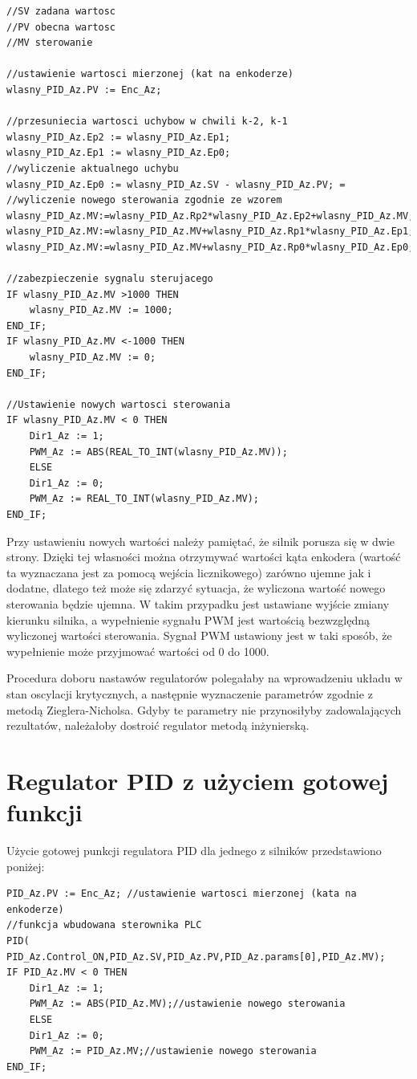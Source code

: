 \begin{lstlisting}[style=customc,frame=single , label=lst:overheat_lock] 
//SV zadana wartosc
//PV obecna wartosc
//MV sterowanie

//ustawienie wartosci mierzonej (kat na enkoderze)
wlasny_PID_Az.PV := Enc_Az; 

//przesuniecia wartosci uchybow w chwili k-2, k-1
wlasny_PID_Az.Ep2 := wlasny_PID_Az.Ep1; 
wlasny_PID_Az.Ep1 := wlasny_PID_Az.Ep0;
//wyliczenie aktualnego uchybu
wlasny_PID_Az.Ep0 := wlasny_PID_Az.SV - wlasny_PID_Az.PV; =
//wyliczenie nowego sterowania zgodnie ze wzorem
wlasny_PID_Az.MV:=wlasny_PID_Az.Rp2*wlasny_PID_Az.Ep2+wlasny_PID_Az.MV;
wlasny_PID_Az.MV:=wlasny_PID_Az.MV+wlasny_PID_Az.Rp1*wlasny_PID_Az.Ep1;
wlasny_PID_Az.MV:=wlasny_PID_Az.MV+wlasny_PID_Az.Rp0*wlasny_PID_Az.Ep0;

//zabezpieczenie sygnalu sterujacego
IF wlasny_PID_Az.MV >1000 THEN
	wlasny_PID_Az.MV := 1000;
END_IF;
IF wlasny_PID_Az.MV <-1000 THEN
	wlasny_PID_Az.MV := 0;
END_IF;

//Ustawienie nowych wartosci sterowania
IF wlasny_PID_Az.MV < 0 THEN
	Dir1_Az := 1;
	PWM_Az := ABS(REAL_TO_INT(wlasny_PID_Az.MV));
	ELSE
	Dir1_Az := 0;
	PWM_Az := REAL_TO_INT(wlasny_PID_Az.MV);
END_IF;
\end{lstlisting}

Przy ustawieniu nowych wartości należy pamiętać, że silnik porusza się w dwie strony. Dzięki tej własności można otrzymywać wartości kąta enkodera (wartość ta wyznaczana jest za pomocą wejścia licznikowego) zarówno ujemne jak i dodatne, dlatego też może się zdarzyć sytuacja, że wyliczona wartość nowego sterowania będzie ujemna. W takim przypadku jest ustawiane wyjście zmiany kierunku silnika, a wypełnienie sygnału PWM jest wartością bezwzględną wyliczonej wartości sterowania.
Sygnał PWM ustawiony jest w taki sposób, że wypełnienie może przyjmować wartości od 0 do 1000.

Procedura doboru nastawów regulatorów polegałaby na wprowadzeniu układu w stan oscylacji krytycznych, a następnie wyznaczenie parametrów zgodnie z metodą Zieglera-Nicholsa. Gdyby te parametry nie przynosiłyby zadowalających rezultatów, należałoby dostroić regulator metodą inżynierską.

\section{Regulator PID z użyciem gotowej funkcji}
Użycie gotowej punkcji regulatora PID dla jednego z silników przedstawiono poniżej:
\begin{lstlisting}[style=customc,frame=single , label=lst:overheat_lock] 
PID_Az.PV := Enc_Az; //ustawienie wartosci mierzonej (kata na enkoderze)
//funkcja wbudowana sterownika PLC
PID( PID_Az.Control_ON,PID_Az.SV,PID_Az.PV,PID_Az.params[0],PID_Az.MV); 
IF PID_Az.MV < 0 THEN
	Dir1_Az := 1;
	PWM_Az := ABS(PID_Az.MV);//ustawienie nowego sterowania
	ELSE
	Dir1_Az := 0;
	PWM_Az := PID_Az.MV;//ustawienie nowego sterowania
END_IF;
\end{lstlisting}

